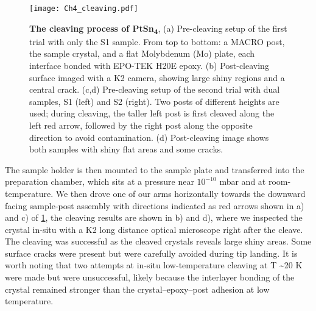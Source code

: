 \begin{figure}
	\centering
	\texttt{[image: Ch4\_cleaving.pdf]}
	\caption[\textbf{The cleaving process of PtSn\textsubscript{4}}]{\textbf{The cleaving process of PtSn\textsubscript{4}}, (a) Pre-cleaving setup of the first trial with only the S1 sample. From top to bottom: a MACRO post, the sample crystal, and a flat Molybdenum (Mo) plate, each interface bonded with EPO-TEK H20E epoxy. (b) Post-cleaving surface imaged with a K2 camera, showing large shiny regions and a central crack. (c,d) Pre-cleaving setup of the second trial with dual samples, S1 (left) and S2 (right). Two posts of different heights are used; during cleaving, the taller left post is first cleaved along the left red arrow, followed by the right post along the opposite direction to avoid contamination. (d) Post-cleaving image shows both samples with shiny flat areas and some cracks.}
	\label{fig:ch4_cleaves}
\end{figure}

\par The sample holder is then mounted to the sample plate and transferred into the preparation chamber, which sits at a pressure near $10^{-10}$ mbar and at room-temperature. We then drove one of our arms horizontally towards the downward facing sample-post assembly with directions indicated as red arrows shown in a) and c) of \ref{fig:ch4_cleaves}, the cleaving results are shown in b) and d), where we inspected the crystal in-situ with a K2 long distance optical microscope right after the cleave. The cleaving was successful as the cleaved crystals reveals large shiny areas. Some surface cracks were present but were carefully avoided during tip landing. It is worth noting that two attempts at in-situ low-temperature cleaving at T \textasciitilde 20 K were made but were unsuccessful, likely because the interlayer bonding of the crystal remained stronger than the crystal–epoxy–post adhesion at low temperature.

